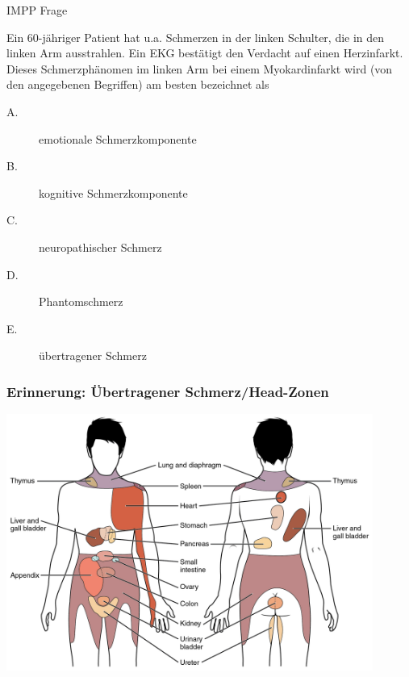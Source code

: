 \documentclass{beamer}
\begin{document}








\begin{frame}{IMPP Frage}


Ein 60-jähriger Patient hat u.a. Schmerzen in der linken Schulter, die in den linken Arm ausstrahlen. Ein EKG bestätigt den Verdacht auf einen Herzinfarkt. Dieses Schmerzphänomen im linken Arm bei einem Myokardinfarkt wird (von den angegebenen Begriffen) am besten bezeichnet als 

\begin{description}
    \item[A.] emotionale Schmerzkomponente
    \item[B.] kognitive Schmerzkomponente
    \item[C.] neuropathischer Schmerz
    \item[D.] Phantomschmerz
    \item[E.] übertragener Schmerz
\end{description}
    
\end{frame}


\begin{frame}
\frametitle{Erinnerung: Übertragener Schmerz/Head-Zonen}



\begin{center}
\includegraphics[width=0.9\textwidth]{Referred_Pain_Chart.jpg}
\end{center}

\end{frame}
\end{document}
